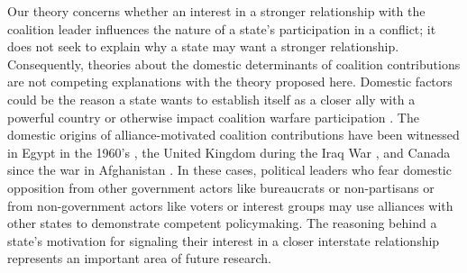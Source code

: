 \documentclass[12pt,letterpaper]{article}
\begin{document}
	Our theory concerns whether an interest in a stronger relationship with the coalition leader influences the nature of a state's participation in a conflict; it does not seek to explain why a state may want a stronger relationship. Consequently, theories about the domestic determinants of coalition contributions are not competing explanations with the theory proposed here. Domestic factors could be the reason a state wants to establish itself as a closer ally with a powerful country \citep{tago_whenaredemocratic_2009, pilster_aredemocraciesbetter_2011, wolford_nationalleaderspolitical_2016} or otherwise impact coalition warfare participation \citep{baum_iraqcoalitionwilling_2013}. The domestic origins of alliance-motivated coalition contributions have been witnessed in Egypt in the 1960's \citep{barnett_domesticsourcesalliances_1991}, the United Kingdom during the Iraq War \citep{davidson_americaallieswar_2011}, and Canada since the war in Afghanistan \citep{massie_alliancevaluestatus_2018, mckay_whycanadabest_2018}. In these cases, political leaders who fear domestic opposition from other government actors like bureaucrats or non-partisans or from non-government actors like voters or interest groups may use alliances with other states to demonstrate competent policymaking. The reasoning behind a state's motivation for signaling their interest in a closer interstate relationship represents an important area of future research.
\end{document}
